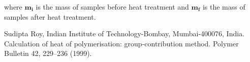 \documentclass[a4paper, 11pt]{article}
\begin{document}
where $\bm{m_{i}}$ is the mass of samples before heat treatment and $\bm{m_{f}}$ is the mass of samples after heat treatment.

\newpage
\thispagestyle{empty}


\begin{thebibliography}{11}

 Sudipta Roy, Indian Institute of Technology-Bombay, Mumbai-400076, India. Calculation of heat of polymerisation: group-contribution method. Polymer Bulletin 42, 229–236 (1999).

\end{thebibliography}
\end{document}
